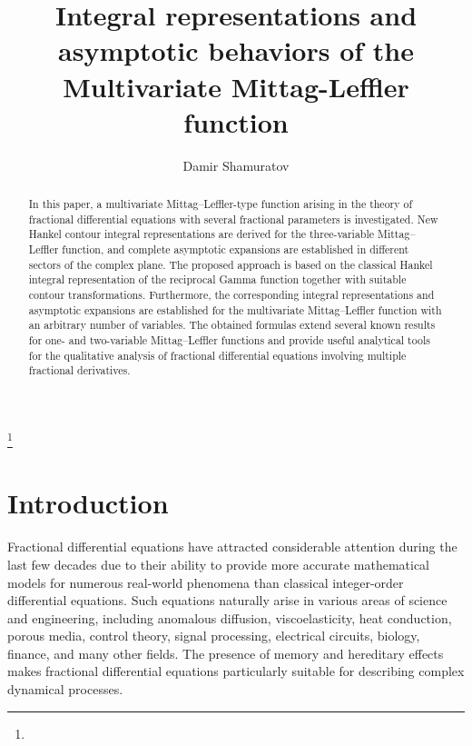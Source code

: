 \documentclass[12pt, reqno]{amsart}
\theoremstyle{definition}
\theoremstyle{remark}
\numberwithin{equation}{section}
\begin{document}
\setcounter{page}{1}

\title[Integral representations and asymptotic behaviors \dots ]{Integral representations and asymptotic behaviors of the Multivariate Mittag-Leffler function}

\author[D. Shamuratov]{Damir Shamuratov}


\thanks{}



\subjclass[2010]{}

\keywords{}


\begin{abstract}
 In this paper, a multivariate Mittag--Leffler-type function arising in the theory of fractional differential equations with several fractional parameters is investigated. New Hankel contour integral representations are derived for the three-variable Mittag--Leffler function, and complete asymptotic expansions are established in different sectors of the complex plane. The proposed approach is based on the classical Hankel integral representation of the reciprocal Gamma function together with suitable contour transformations. Furthermore, the corresponding integral representations and asymptotic expansions are established for the multivariate Mittag--Leffler function with an arbitrary number of variables. The obtained formulas extend several known results for one- and two-variable Mittag--Leffler functions and provide useful analytical tools for the qualitative analysis of fractional differential equations involving multiple fractional derivatives.
\end{abstract} \maketitle


\section{Introduction}

        Fractional differential equations have attracted considerable attention during the last few decades due to their ability to provide more accurate mathematical models for numerous real-world phenomena than classical integer-order differential equations. Such equations naturally arise in various areas of science and engineering, including anomalous diffusion, viscoelasticity, heat conduction, porous media, control theory, signal processing, electrical circuits, biology, finance, and many other fields. The presence of memory and hereditary effects makes fractional differential equations particularly suitable for describing complex dynamical processes.
\end{document}
